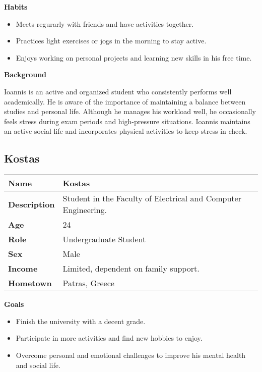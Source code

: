 \begin{center} \textbf{Habits} \end{center}
\begin{itemize}
    \item Meets regurarly with friends and have activities together.
    \item Practices light exercises or jogs in the morning to stay active.
    \item Enjoys working on personal projects and learning new skills in his free time.
\end{itemize}

\begin{center} \textbf{Background} \end{center}
Ioannis is an active and organized student who consistently performs well academically. He is aware of the importance of maintaining a balance between studies and personal life. Although he manages his workload well, he occasionally feels stress during exam periods and high-pressure situations. Ioannis maintains an active social life and incorporates physical activities to keep stress in check.

\subsection{Kostas}

\FloatBarrier
\begin{table}[ht]
\centering
\begin{tabular}{|l|p{11cm}|}
\hline
\textbf{Name} & Kostas \\ \hline
\textbf{Description} & Student in the Faculty of Electrical and Computer Engineering. \\ \hline
\textbf{Age} & 24 \\ \hline
\textbf{Role} & Undergraduate Student \\ \hline
\textbf{Sex} & Male \\ \hline
\textbf{Income} & Limited, dependent on family support. \\ \hline
\textbf{Hometown} & Patras, Greece \\ \hline
\end{tabular}
\label{tab:persona_kostas}
\end{table}
\FloatBarrier

\begin{center} \textbf{Goals} \end{center}
\begin{itemize}
    \item Finish the university with a decent grade.
    \item Participate in more activities and find new hobbies to enjoy.
    \item Overcome personal and emotional challenges to improve his mental health and social life.
\end{itemize}

